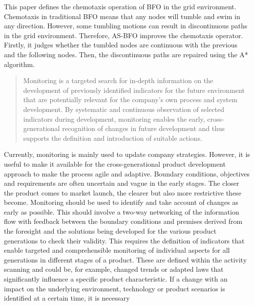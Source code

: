 \documentclass{PDS}%
\theoremstyle{definition}
\begin{document}

This paper defines the chemotaxis operation of BFO in the grid environment. Chemotaxis in
traditional BFO means that any nodes will tumble and swim in any direction. However, some
tumbling motions can result in discontinuous paths in the grid environment. Therefore, AS-BFO
improves the chemotaxis operator. Firstly, it judges whether the tumbled nodes are
continuous with the previous and the following nodes. Then, the discontinuous paths are
repaired using the A* algorithm. 
\begin{quote}
Monitoring is a targeted search for in-depth information on the development of
previously identified indicators for the future environment that are potentially relevant
for the company's own process and system development. By systematic and continuous
observation of selected indicators during development, monitoring enables the early,
cross-generational recognition of changes in future development and thus supports the
definition and introduction of suitable actions.
\end{quote}
Currently, monitoring is mainly used to update company strategies. However, it is useful to make it
available for the cross-generational product development approach to make the process agile and
adaptive. Boundary conditions, objectives and requirements are often uncertain and vague in the early
stages. The closer the product comes to market launch, the clearer but also more restrictive these
become. Monitoring should be used to identify and take account of changes as early as possible. This
should involve a two-way networking of the information flow with feedback between the boundary
conditions and premises derived from the foresight and the solutions being developed for the various
product generations to check their validity. This requires the definition of indicators that enable targeted
and comprehensible monitoring of individual aspects for all generations in different stages of a product.
These are defined within the activity scanning and could be, for example, changed trends or adapted
laws that significantly influence a specific product characteristic. If a change with an impact on the
underlying environment, technology or product scenarios is identified at a certain time, it is necessary
\end{document}
